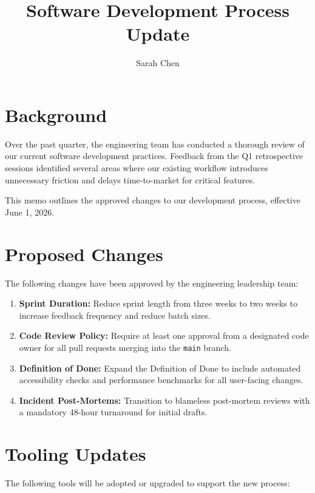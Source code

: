 \documentclass[
    language=english,
    doctype=memo,
    institution=none,
]{../../omnilatex}
\title{Software Development Process Update}
\author{Sarah Chen}
\date{}
\begin{document}
\maketitle

\section{Background}

Over the past quarter, the engineering team has conducted a thorough review of our
current software development practices. Feedback from the Q1 retrospective
sessions identified several areas where our existing workflow introduces
unnecessary friction and delays time-to-market for critical features.

This memo outlines the approved changes to our development process, effective
June 1, 2026.

\section{Proposed Changes}

The following changes have been approved by the engineering leadership team:

\begin{enumerate}
    \item \textbf{Sprint Duration:} Reduce sprint length from three weeks to
          two weeks to increase feedback frequency and reduce batch sizes.
    \item \textbf{Code Review Policy:} Require at least one approval from a
          designated code owner for all pull requests merging into the
          \texttt{main} branch.
    \item \textbf{Definition of Done:} Expand the Definition of Done to include
          automated accessibility checks and performance benchmarks for all
          user-facing changes.
    \item \textbf{Incident Post-Mortems:} Transition to blameless post-mortem
          reviews with a mandatory 48-hour turnaround for initial drafts.
\end{enumerate}

\section{Tooling Updates}

The following tools will be adopted or upgraded to support the new process:
\end{document}
